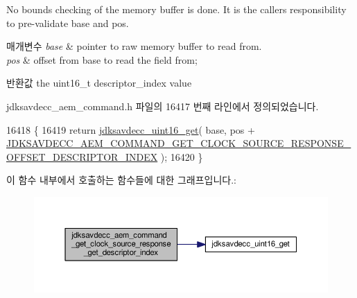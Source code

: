 No bounds checking of the memory buffer is done. It is the caller\textquotesingle{}s responsibility to pre-\/validate base and pos.


\begin{DoxyParams}{매개변수}
{\em base} & pointer to raw memory buffer to read from. \\
\hline
{\em pos} & offset from base to read the field from; \\
\hline
\end{DoxyParams}
\begin{DoxyReturn}{반환값}
the uint16\+\_\+t descriptor\+\_\+index value 
\end{DoxyReturn}


jdksavdecc\+\_\+aem\+\_\+command.\+h 파일의 16417 번째 라인에서 정의되었습니다.


\begin{DoxyCode}
16418 \{
16419     \textcolor{keywordflow}{return} \hyperlink{group__endian_ga3fbbbc20be954aa61e039872965b0dc9}{jdksavdecc\_uint16\_get}( base, pos + 
      \hyperlink{group__command__get__clock__source__response_ga59ba0eb400a72de784cd7e65c3acaf05}{JDKSAVDECC\_AEM\_COMMAND\_GET\_CLOCK\_SOURCE\_RESPONSE\_OFFSET\_DESCRIPTOR\_INDEX}
       );
16420 \}
\end{DoxyCode}


이 함수 내부에서 호출하는 함수들에 대한 그래프입니다.\+:
\nopagebreak
\begin{figure}[H]
\begin{center}
\leavevmode
\includegraphics[width=350pt]{group__command__get__clock__source__response_gad8b3114a21e48deca8292d646417d4ce_cgraph}
\end{center}
\end{figure}





